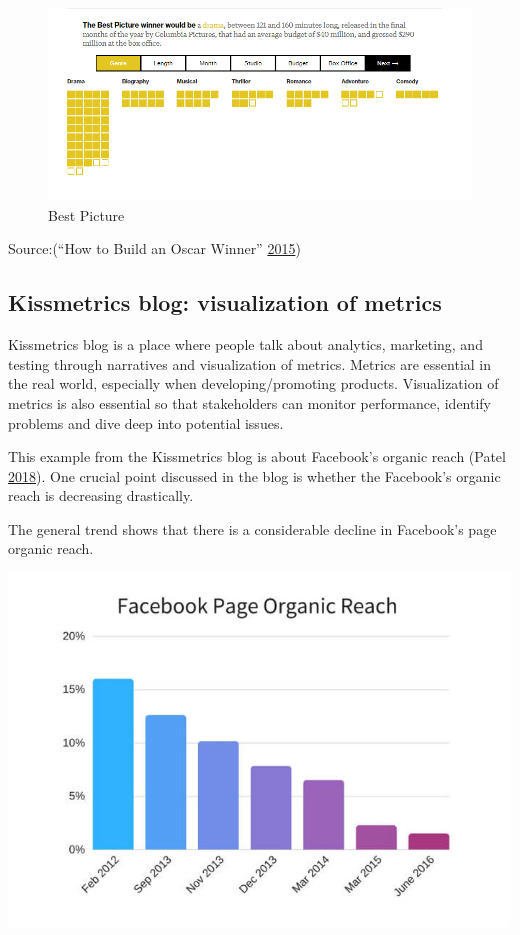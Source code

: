 \documentclass[]{book}
\begin{document}
\begin{figure}
\centering
\includegraphics{images/img_oscars_pic.PNG}
\caption{Best Picture}
\end{figure}

Source:(``How to Build an Oscar Winner'' \protect\hyperlink{ref-oscars_sowhite_chart}{2015})

\hypertarget{kissmetrics-blog-visualization-of-metrics}{%
\subsection{Kissmetrics blog: visualization of metrics}\label{kissmetrics-blog-visualization-of-metrics}}

Kissmetrics blog is a place where people talk about analytics, marketing, and testing through narratives and visualization of metrics. Metrics are essential in the real world, especially when developing/promoting products. Visualization of metrics is also essential so that stakeholders can monitor performance, identify problems and dive deep into potential issues.

This example from the Kissmetrics blog is about Facebook's organic reach (Patel \protect\hyperlink{ref-facebook_organic}{2018}). One crucial point discussed in the blog is whether the Facebook's organic reach is decreasing drastically.

The general trend shows that there is a considerable decline in Facebook's page organic reach.

\includegraphics{images/facebook-page-organic-reach-decline-over-years.jpg}
\end{document}

